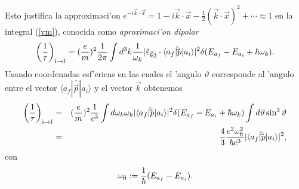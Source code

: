Esto justifica la approximaci'on
$e^{-i\vec{k}\cdot\vec{x}}=1-i\vec{k}\cdot\vec{x}-\frac{1}{2}(\vec{k}\cdot\vec{
x})^2+\cdots\approx 1$ en la integral (\ref{vm}), conocida como
\textit{aproximaci'on dipolar}
\begin{equation}
\left(\frac{1}{\tau}\right)_{\rm i\rightarrow f}=
(\frac{e}{m})^2
\frac{1}{2\pi}\int d^3k
\frac{1}{\omega_k}
|\check{\varepsilon}_{\vec{k}2}\cdot\langle a_f|{\hat\vec{p}}|a_i\rangle |^2
\delta(E_{a_f}-E_{a_i}+\hbar\omega_k).
\end{equation}
Usando coordenadas esf'ericas en las cuales el 'angulo $\vartheta$ corresponde
al 'angulo entre el vector
$\langle a_f|{\hat\vec{p}}|a_i\rangle $ y el vector $\vec{k}$ obtenemos
\begin{eqnarray}
\left(\frac{1}{\tau}\right)_{\rm i\rightarrow f}&=&
(\frac{e}{m})^2\frac{1}{c^3}\int d\omega_k \omega_k |
\langle a_f|{\hat\vec{p}}|a_i\rangle |^2 \delta(E_{a_f}-E_{a_i}+\hbar\omega_k)
\int d\vartheta \sin^3\vartheta\nonumber\\
&=&\frac{4}{3}\frac{e^2\omega^2_{\rm fi}}{\hbar c^3}|
\langle a_f|{\hat\vec{p}}|a_i\rangle |^2,
\end{eqnarray}
con 
\begin{equation}
\omega_{\rm fi}:=\frac{1}{\hbar}(E_{a_f}-E_{a_i}).
\end{equation}

